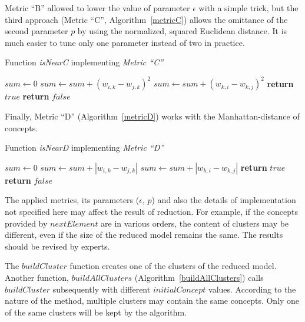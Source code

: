 \documentclass[graybox]{svmult}
\begin{document}
Metric ``B'' allowed to lower the value of parameter $\epsilon$ with a simple trick, but the third approach (Metric ``C'', Algorithm~\ref{metricC}) allows the omittance of the second parameter $p$ by using the normalized, squared Euclidean distance. It is much easier to tune only one parameter instead of two in practice.

\begin{algorithm}
  \caption{Function \emph{isNearC} implementing \emph{Metric ``C''}}\label{metricC}
  \begin{algorithmic}[1]
      \State $sum \gets 0$
          \State $sum \gets sum + (w_{i, k} - w_{j, k})^2$
          \State $sum \gets sum + (w_{k, i} - w_{k, j})^2$
        \EndIf
      \EndFor
        \State \textbf{return} $true$
      \Else
        \State \textbf{return} $false$
      \EndIf
    \EndFunction
  \end{algorithmic}
\end{algorithm}

Finally, Metric ``D'' (Algorithm~\ref{metricD}) works with the Manhattan-distance of concepts.

\begin{algorithm}
  \caption{Function \emph{isNearD} implementing \emph{Metric ``D''}}\label{metricD}
  \begin{algorithmic}[1]
      \State $sum \gets 0$
          \State $sum \gets sum + |w_{i, k} - w_{j, k}|$
          \State $sum \gets sum + |w_{k, i} - w_{k, j}|$
        \EndIf
      \EndFor
        \State \textbf{return} $true$
      \Else
        \State \textbf{return} $false$
      \EndIf
    \EndFunction
  \end{algorithmic}
\end{algorithm}

The applied metrics, its parameters ($\epsilon$, $p$) and also the details of implementation not specified here may affect the result of reduction. For example, if the concepts provided by $nextElement$ are in various orders, the content of clusters may be different, even if the size of the reduced model remains the same. The results should be revised by experts.

The $buildCluster$ function creates one of the clusters of the reduced model. Another function, $buildAllClusters$ (Algorithm~\ref{buildAllClusters}) calls $buildCluster$ subsequently with different $initialConcept$ values. According to the nature of the method, multiple clusters may contain the same concepts. Only one of the same clusters will be kept by the algorithm.
\end{document}
